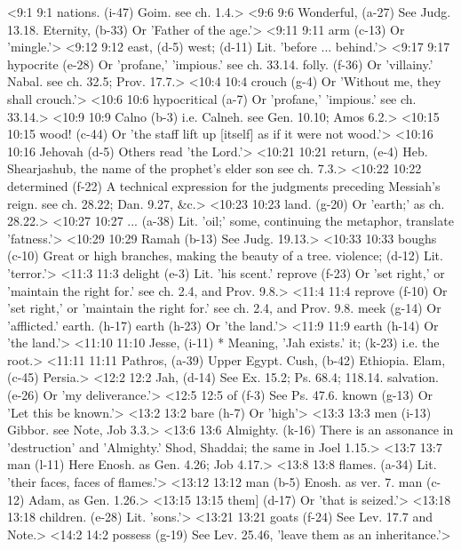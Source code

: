<9:1 9:1  nations. (i-47)  Goim. see ch. 1.4.>
<9:6 9:6  Wonderful, (a-27)  See Judg. 13.18.
  Eternity, (b-33)  Or 'Father of the age.'>
<9:11 9:11  arm (c-13)  Or 'mingle.'>
<9:12 9:12  east, (d-5)  west; (d-11)
  Lit. 'before ... behind.'>
<9:17 9:17  hypocrite (e-28)  Or 'profane,' 'impious.' see ch. 33.14.
  folly. (f-36)  Or 'villainy.' Nabal. see ch. 32.5; Prov. 17.7.>
<10:4 10:4  crouch (g-4)  Or 'Without me, they shall crouch.'>
<10:6 10:6  hypocritical (a-7)  Or 'profane,' 'impious.' see ch. 33.14.>
<10:9 10:9  Calno (b-3)  i.e. Calneh. see Gen. 10.10; Amos 6.2.>
<10:15 10:15  wood! (c-44)  Or 'the staff lift up [itself] as if it were not wood.'>
<10:16 10:16  Jehovah (d-5)  Others read 'the Lord.'>
<10:21 10:21  return, (e-4)  Heb. Shearjashub, the name of the prophet's elder son see  ch. 7.3.>
<10:22 10:22  determined (f-22)  A technical expression for the judgments preceding Messiah's  reign. see ch. 28.22; Dan. 9.27, &c.>
<10:23 10:23  land. (g-20)  Or 'earth;' as ch. 28.22.>
<10:27 10:27  ... (a-38)  Lit. 'oil;' some, continuing the metaphor, translate  'fatness.'>
<10:29 10:29  Ramah (b-13)  See Judg. 19.13.>
<10:33 10:33  boughs (c-10)  Great or high branches, making the beauty of a tree.
  violence; (d-12)  Lit. 'terror.'>
<11:3 11:3  delight (e-3)  Lit. 'his scent.'
  reprove (f-23)  Or 'set right,' or 'maintain the right for.' see ch. 2.4, and  Prov. 9.8.>
<11:4 11:4  reprove (f-10)  Or 'set right,' or 'maintain the right for.' see ch. 2.4, and  Prov. 9.8.
  meek (g-14)  Or 'afflicted.'
  earth. (h-17)  earth (h-23)
  Or 'the land.'>
<11:9 11:9  earth (h-14)  Or 'the land.'>
<11:10 11:10  Jesse, (i-11)  * Meaning, 'Jah exists.'
  it; (k-23)  i.e. the root.>
<11:11 11:11  Pathros, (a-39)  Upper Egypt.
  Cush, (b-42)  Ethiopia.
  Elam, (c-45)  Persia.>
<12:2 12:2  Jah, (d-14)  See Ex. 15.2; Ps. 68.4; 118.14.
  salvation. (e-26)  Or 'my deliverance.'>
<12:5 12:5  of (f-3)  See Ps. 47.6.
  known (g-13)  Or 'Let this be known.'>
<13:2 13:2  bare (h-7)  Or 'high'>
<13:3 13:3  men (i-13)  Gibbor. see Note, Job 3.3.>
<13:6 13:6  Almighty. (k-16)  There is an assonance in 'destruction' and 'Almighty.'  Shod, Shaddai; the same in Joel 1.15.>
<13:7 13:7  man (l-11)  Here Enosh. as Gen. 4.26; Job 4.17.>
<13:8 13:8  flames. (a-34)  Lit. 'their faces, faces of flames.'>
<13:12 13:12  man (b-5)  Enosh. as ver. 7.
  man (c-12)  Adam, as Gen. 1.26.>
<13:15 13:15  them] (d-17)  Or 'that is seized.'>
<13:18 13:18  children. (e-28)  Lit. 'sons.'>
<13:21 13:21  goats (f-24)  See Lev. 17.7 and Note.>
<14:2 14:2  possess (g-19)  See Lev. 25.46, 'leave them as an inheritance.'>
